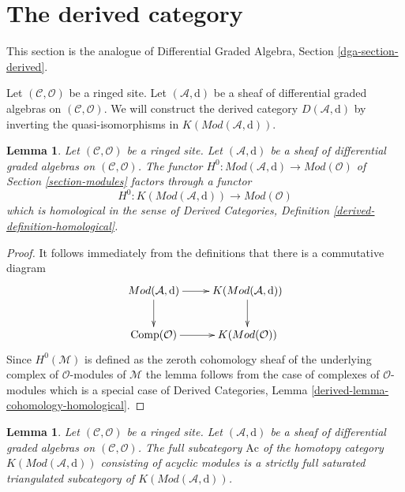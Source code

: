 \documentclass{stacks-project}
\theoremstyle{plain}
\newtheorem{lemma}[subsection]{Lemma}
\theoremstyle{definition}
\theoremstyle{remark}
\numberwithin{equation}{subsection}
\begin{document}
\section{The derived category}
\label{section-derived}

\noindent
This section is the analogue of Differential Graded Algebra, Section
\ref{dga-section-derived}.

\medskip\noindent
Let $(\mathcal{C}, \mathcal{O})$ be a ringed site. Let
$(\mathcal{A}, \text{d})$ be a sheaf of differential graded algebras
on $(\mathcal{C}, \mathcal{O})$. We will construct the derived
category $D(\mathcal{A}, \text{d})$ by inverting the quasi-isomorphisms
in $K(\textit{Mod}(\mathcal{A}, \text{d}))$.

\begin{lemma}
\label{lemma-cohomology-homological}
Let $(\mathcal{C}, \mathcal{O})$ be a ringed site. Let
$(\mathcal{A}, \text{d})$ be a sheaf of differential graded algebras
on $(\mathcal{C}, \mathcal{O})$. The functor 
$H^0 : \textit{Mod}(\mathcal{A}, \text{d}) \to \textit{Mod}(\mathcal{O})$
of Section \ref{section-modules} factors through a
functor
$$
H^0 : K(\textit{Mod}(\mathcal{A}, \text{d})) \to \textit{Mod}(\mathcal{O})
$$
which is homological in the sense of
Derived Categories, Definition \ref{derived-definition-homological}.
\end{lemma}

\begin{proof}
It follows immediately from the definitions that there is
a commutative diagram
$$
\xymatrix{
\textit{Mod}(\mathcal{A}, \text{d}) \ar[r] \ar[d] &
K(\textit{Mod}(\mathcal{A}, \text{d})) \ar[d] \\
\text{Comp}(\mathcal{O}) \ar[r] &
K(\textit{Mod}(\mathcal{O}))
}
$$
Since $H^0(\mathcal{M})$ is defined as the zeroth cohomology
sheaf of the underlying complex of $\mathcal{O}$-modules of $\mathcal{M}$
the lemma follows from the case of complexes of $\mathcal{O}$-modules
which is a special case of
Derived Categories, Lemma \ref{derived-lemma-cohomology-homological}.
\end{proof}

\begin{lemma}
\label{lemma-acyclics}
Let $(\mathcal{C}, \mathcal{O})$ be a ringed site. Let
$(\mathcal{A}, \text{d})$ be a sheaf of differential graded algebras
on $(\mathcal{C}, \mathcal{O})$. The full subcategory $\text{Ac}$
of the homotopy category $K(\textit{Mod}(\mathcal{A}, \text{d}))$
consisting of acyclic modules is a strictly full saturated
triangulated subcategory of $K(\textit{Mod}(\mathcal{A}, \text{d}))$.
\end{lemma}
\end{document}
